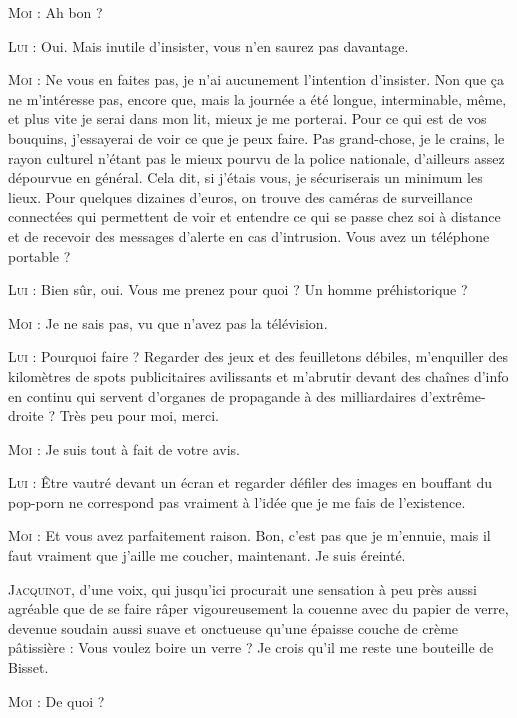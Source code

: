 \begin{dialogue}
\textsc{Moi} : Ah bon ?

\textsc{Lui} : Oui. Mais inutile d’insister, vous n’en saurez pas davantage.

\textsc{Moi} : Ne vous en faites pas, je n’ai aucunement l’intention d’insister. Non que ça ne m’intéresse pas, encore que, mais la journée a été longue, interminable, même, et plus vite je serai dans mon lit, mieux je me porterai. Pour ce qui est de vos bouquins, j’essayerai de voir ce que je peux faire. Pas grand-chose, je le crains, le rayon culturel n’étant pas le mieux pourvu de la police nationale, d’ailleurs assez dépourvue en général. Cela dit, si j’étais vous, je sécuriserais un minimum les lieux. Pour quelques dizaines d’euros, on trouve des caméras de surveillance connectées qui permettent de voir et entendre ce qui se passe chez soi à distance et de recevoir des messages d’alerte en cas d’intrusion. Vous avez un téléphone portable ?

\textsc{Lui} : Bien sûr, oui. Vous me prenez pour quoi ? Un homme préhistorique ?

\textsc{Moi} : Je ne sais pas, vu que n’avez pas la télévision.

\textsc{Lui} : Pourquoi faire ? Regarder des jeux et des feuilletons débiles, m’enquiller des kilomètres de spots publicitaires avilissants et m’abrutir devant des chaînes d’info en continu qui servent d’organes de propagande à des milliardaires d’extrême-droite ? Très peu pour moi, merci.

\textsc{Moi} : Je suis tout à fait de votre avis.

\textsc{Lui} : Être vautré devant un écran et regarder défiler des images en bouffant du pop-porn ne correspond pas vraiment à l’idée que je me fais de l’existence.

\textsc{Moi} : Et vous avez parfaitement raison. Bon, c’est pas que je m’ennuie, mais il faut vraiment que j’aille me coucher, maintenant. Je suis éreinté.

\textsc{Jacquinot}, d’une voix, qui jusqu’ici procurait une sensation à peu près aussi agréable que de se faire râper vigoureusement la couenne avec du papier de verre, devenue soudain aussi suave et onctueuse qu’une épaisse couche de crème pâtissière : Vous voulez boire un verre ? Je crois qu’il me reste une bouteille de Bisset.

\textsc{Moi} : De quoi ?


\end{dialogue}
